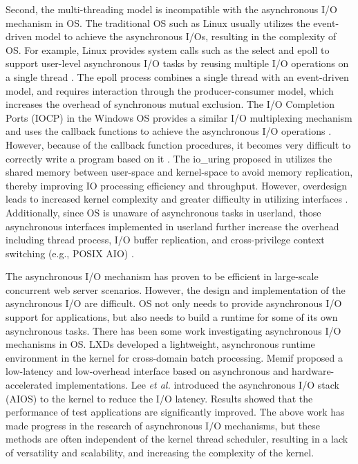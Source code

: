 \documentclass[sigconf,review,anonymous]{acmart}
\begin{document}
Second, the multi-threading model is incompatible with the asynchronous I/O mechanism in OS. The traditional OS such as Linux usually utilizes the event-driven model to achieve the asynchronous I/Os, resulting in the complexity of OS. For example, Linux provides system calls such as the select and epoll to support user-level asynchronous I/O tasks by reusing multiple I/O operations on a single thread \cite{Gammo2004ComparingAE}. The epoll process combines a single thread with an event-driven model, and requires interaction through the producer-consumer model, which increases the overhead of synchronous mutual exclusion. The I/O Completion Ports (IOCP) in the Windows OS provides a similar I/O multiplexing mechanism and uses the callback functions to achieve the asynchronous I/O operations \cite{alvinashcraft_io_2022}. However, because of the callback function procedures, it becomes very difficult to correctly write a program based on it \cite{callbackhell}. The io\_uring proposed in \cite{io_uring} utilizes the shared memory between user-space and kernel-space to avoid memory replication, thereby improving IO processing efficiency and throughput. However, overdesign leads to increased kernel complexity and greater difficulty in utilizing interfaces \cite{li2021pm}. Additionally, since OS is unaware of asynchronous tasks in userland, those asynchronous interfaces implemented in userland further increase the overhead including thread process, I/O buffer replication, and cross-privilege context switching (e.g., POSIX AIO) \cite{jones2006boost}.

The asynchronous I/O mechanism has proven to be efficient in large-scale concurrent web server scenarios. However, the design and implementation of the asynchronous I/O are difficult. OS not only needs to provide asynchronous I/O support for applications, but also needs to build a runtime for some of its own asynchronous tasks. There has been some work investigating asynchronous I/O mechanisms in OS. LXDs \cite{narayanan2019lxds} developed a lightweight, asynchronous runtime environment in the kernel for cross-domain batch processing. Memif \cite{lin2016memif} proposed a low-latency and low-overhead interface based on asynchronous and hardware-accelerated implementations. Lee \textit{et al.} \cite{lee2019asynchronous} introduced the asynchronous I/O stack (AIOS) to the kernel to reduce the I/O latency. Results showed that the performance of test applications are significantly improved. The above work has made progress in the research of asynchronous I/O mechanisms, but these methods are often independent of the kernel thread scheduler, resulting in a lack of versatility and scalability, and increasing the complexity of the kernel.
\end{document}
